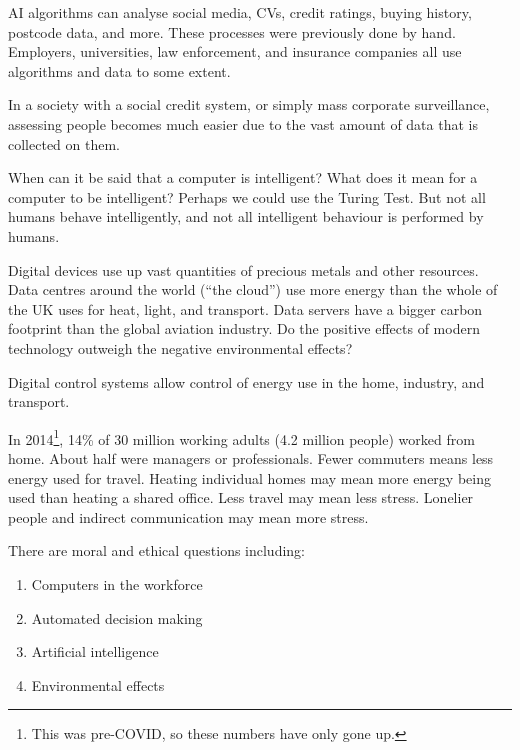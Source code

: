 \documentclass[../main.tex]{subfile}
\begin{document}
AI algorithms can analyse social media, CVs, credit ratings, buying history, postcode data, and more. These processes were previously done by hand. Employers, universities, law enforcement, and insurance companies all use algorithms and data to some extent.

In a society with a social credit system, or simply mass corporate surveillance, assessing people becomes much easier due to the vast amount of data that is collected on them.

When can it be said that a computer is intelligent? What does it mean for a computer to be intelligent? Perhaps we could use the Turing Test. But not all humans behave intelligently, and not all intelligent behaviour is performed by humans.


Digital devices use up vast quantities of precious metals and other resources. Data centres around the world (\enquote{the cloud}) use more energy than the whole of the UK uses for heat, light, and transport. Data servers have a bigger carbon footprint than the global aviation industry. Do the positive effects of modern technology outweigh the negative environmental effects?

Digital control systems allow control of energy use in the home, industry, and transport.

In 2014\footnote{This was pre-COVID, so these numbers have only gone up.}, 14\% of 30 million working adults (4.2 million people) worked from home. About half were managers or professionals. Fewer commuters means less energy used for travel. Heating individual homes may mean more energy being used than heating a shared office. Less travel may mean less stress. Lonelier people and indirect communication may mean more stress.


There are moral and ethical questions including: \begin{enumerate}
	\item Computers in the workforce
	\item Automated decision making
	\item Artificial intelligence
	\item Environmental effects
\end{enumerate}
\end{document}
